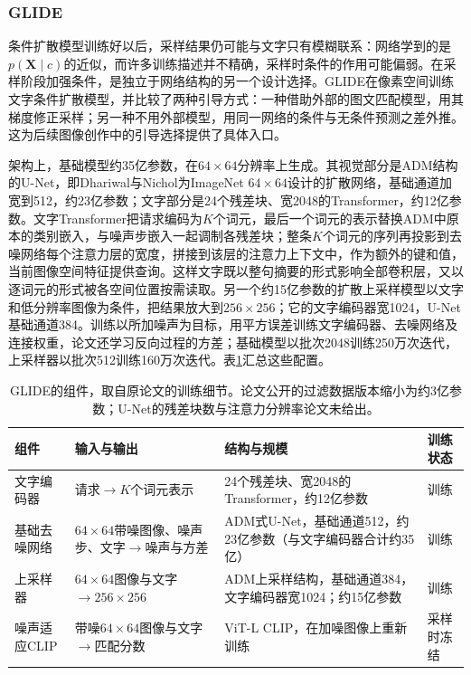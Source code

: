 \subsubsection{GLIDE}
\label{sec:vision-models-glide}

条件扩散模型训练好以后，采样结果仍可能与文字只有模糊联系：网络学到的是$p(\bm X\mid c)$的近似，而许多训练描述并不精确，采样时条件的作用可能偏弱。在采样阶段加强条件，是独立于网络结构的另一个设计选择。GLIDE在像素空间训练文字条件扩散模型，并比较了两种引导方式：一种借助外部的图文匹配模型，用其梯度修正采样；另一种不用外部模型，用同一网络的条件与无条件预测之差外推。这为后续图像创作中的引导选择提供了具体入口。

架构上，基础模型约35亿参数，在$64\times64$分辨率上生成。其视觉部分是ADM结构的U-Net，即Dhariwal与Nichol为ImageNet $64\times64$设计的扩散网络，基础通道加宽到512，约23亿参数；文字部分是24个残差块、宽2048的Transformer，约12亿参数。文字Transformer把请求编码为$K$个词元，最后一个词元的表示替换ADM中原本的类别嵌入，与噪声步嵌入一起调制各残差块；整条$K$个词元的序列再投影到去噪网络每个注意力层的宽度，拼接到该层的注意力上下文中，作为额外的键和值，当前图像空间特征提供查询。这样文字既以整句摘要的形式影响全部卷积层，又以逐词元的形式被各空间位置按需读取。另一个约15亿参数的扩散上采样模型以文字和低分辨率图像为条件，把结果放大到$256\times256$；它的文字编码器宽1024，U-Net基础通道384。训练以所加噪声为目标，用平方误差训练文字编码器、去噪网络及连接权重，论文还学习反向过程的方差；基础模型以批次2048训练250万次迭代，上采样器以批次512训练160万次迭代。表\ref{tab:vision-models-glide-config}汇总这些配置。

\begin{table}[htbp]
  \centering
  \small
  \begin{tabularx}{\linewidth}{@{}p{16mm}XXp{12mm}@{}}
    \toprule
    组件 & 输入与输出 & 结构与规模 & 训练状态\\
    \midrule
    文字编码器 & 请求$\to K$个词元表示 & 24个残差块、宽2048的Transformer，约12亿参数 & 训练\\
    基础去噪网络 & $64\times64$带噪图像、噪声步、文字$\to$噪声与方差 & ADM式U-Net，基础通道512，约23亿参数（与文字编码器合计约35亿） & 训练\\
    上采样器 & $64\times64$图像与文字$\to256\times256$ & ADM上采样结构，基础通道384，文字编码器宽1024；约15亿参数 & 训练\\
    噪声适应CLIP & 带噪$64\times64$图像与文字$\to$匹配分数 & ViT-L CLIP，在加噪图像上重新训练 & 采样时冻结\\
    \bottomrule
  \end{tabularx}
  \caption{GLIDE的组件，取自原论文的训练细节。论文公开的过滤数据版本缩小为约3亿参数；U-Net的残差块数与注意力分辨率论文未给出。}
  \label{tab:vision-models-glide-config}
\end{table}

